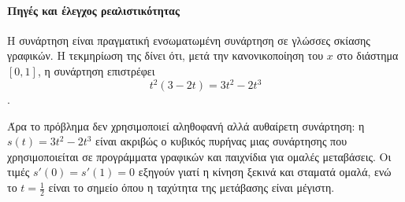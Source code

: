 \paragraph{Πηγές και έλεγχος ρεαλιστικότητας}
Η συνάρτηση  είναι πραγματική ενσωματωμένη συνάρτηση σε
γλώσσες σκίασης γραφικών. Η τεκμηρίωση της  δίνει ότι, μετά
την κανονικοποίηση του \(x\) στο διάστημα \([0,1]\), η συνάρτηση
επιστρέφει
\[
  t^2(3-2t)=3t^2-2t^3
\]
\cite{glslSmoothstepDocs}.

Άρα το πρόβλημα δεν χρησιμοποιεί αληθοφανή αλλά αυθαίρετη συνάρτηση:
η \(s(t)=3t^2-2t^3\) είναι ακριβώς ο κυβικός πυρήνας μιας συνάρτησης
που χρησιμοποιείται σε προγράμματα γραφικών και παιχνίδια για ομαλές
μεταβάσεις. Οι τιμές \(s'(0)=s'(1)=0\) εξηγούν γιατί η κίνηση ξεκινά
και σταματά ομαλά, ενώ το \(t=\frac12\) είναι το σημείο όπου η ταχύτητα
της μετάβασης είναι μέγιστη.
